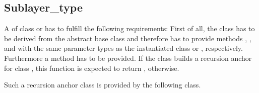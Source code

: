 \subsection{Sublayer\_type}
\label{SubtypeRequirements}
A  of class 
or  has
to fulfill the following requirements:
First of all, the class has to be derived from the abstract base
class  and therefore
has to provide  methods
, ,
 and
with the same parameter types as the instantiated class
 or ,
respectively.
Furthermore a method  has to be provided. If the  class
 builds a recursion anchor for class
, this function is expected to
return ,  otherwise.

Such a recursion anchor class is provided by the following class.


